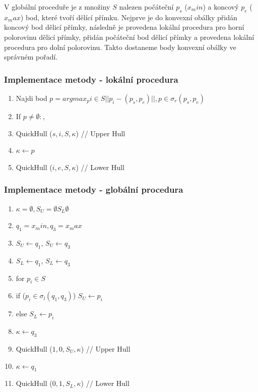 \documentclass[a4paper, 12pt]{article}
\begin{document}
V globální proceduře je z množiny $S$ nalezen počáteční $p_s$ ($x_min$) a koncový $p_e$ ($x_max$) bod, které tvoří dělící přímku. Nejprve je do konvexní obálky přidán koncový bod dělicí přímky, následně je provedena lokální procedura pro horní polorovinu dělicí přímky, přidán počáteční bod dělicí přímky a  provedena lokální procedura pro dolní polorovinu. Takto dostaneme body konvexní obálky ve správném pořadí.

\subsubsection{Implementace metody - lokální procedura}
\begin{enumerate}
	\item Najdi bod $p = arg max_pi \in S ||p_i - (p_s, p_e)||, p \in \sigma_r (p_s, p_e)$
	\item If $ p\neq\emptyset:$,
	\item \hspace {1cm} QuickHull ($s,i,S,\kappa$) // Upper Hull
	\item \hspace {1cm} $\kappa \longleftarrow p$
	\item \hspace {1cm} QuickHull ($i,e,S,\kappa$) // Lower Hull
\end{enumerate}

\subsubsection{Implementace metody - globální procedura}

\begin{enumerate}
	\item  $\kappa = \emptyset, S_U = \emptyset S_L \emptyset$
	\item $q_1 = x_min, q_3 = x_max$
	\item $S_U \longleftarrow q_1$, $S_U \longleftarrow q_3$
	\item $S_L \longleftarrow q_1$, $S_L \longleftarrow q_3$
	\item for $p_i \in S$
	\item \hspace {1cm} if ($p_i \in \sigma_l (q_1, q_3)$) $S_U \longleftarrow p_i$
	\item \hspace {1cm} else $S_L \longleftarrow p_i$
	\item $\kappa \longleftarrow q_3$
	\item QuickHull ($1,0,S_U,\kappa$) // Upper Hull
	\item $\kappa \longleftarrow q_1$
	\item QuickHull ($0,1,S_L,\kappa$) // Lower Hull
\end{enumerate}
\clearpage
\end{document}
